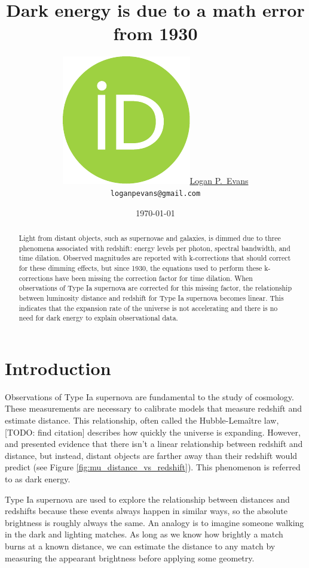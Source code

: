 \documentclass{article}
\title{Dark energy is due to a math error from 1930}
\date{\today}
\author{
  \href{https://orcid.org/0000-0001-6450-3262}{\includegraphics[scale=0.06]{orcid.pdf}\hspace{1mm}Logan P.~Evans}
  \\ \texttt{loganpevans@gmail.com}
}
\begin{document}
\maketitle

\begin{abstract}
  Light from distant objects, such as supernovae and galaxies, is dimmed
  due to three phenomena associated with redshift: energy levels per photon,
  spectral bandwidth, and time dilation. Observed magnitudes are reported with
  k-corrections that should correct for these dimming effects, but since 1930,
  the equations used to perform these k-corrections have been missing the
  correction factor for time dilation. When observations of Type Ia supernova
  are corrected for this missing factor, the relationship between luminosity
  distance and redshift for Type Ia supernova becomes linear. This indicates
  that the expansion rate of the universe is not accelerating and there is no
  need for dark energy to explain observational data.
\end{abstract}


\section{Introduction}

Observations of Type Ia supernova are fundamental to the study of cosmology.
These measurements are necessary to calibrate models that measure redshift and
estimate distance. This relationship, often called the Hubble-Lema\^{i}tre law,
[TODO: find citation] describes how quickly the universe is expanding. However,
\citet{riess1998} and \citet{perlmutter1999} presented evidence that there
isn't a linear relationship between redshift and distance, but instead, distant
objects are farther away than their redshift would predict (see Figure
\ref{fig:mu_distance_vs_redshift}). This phenomenon is referred to as dark
energy.

Type Ia supernova are used to explore the relationship between distances and
redshifts because these events always happen in similar ways, so the absolute
brightness is roughly always the same. An analogy is to imagine someone walking
in the dark and lighting matches. As long as we know how brightly a match burns
at a known distance, we can estimate the distance to any match by measuring the
appearant brightness before applying some geometry.
\end{document}
